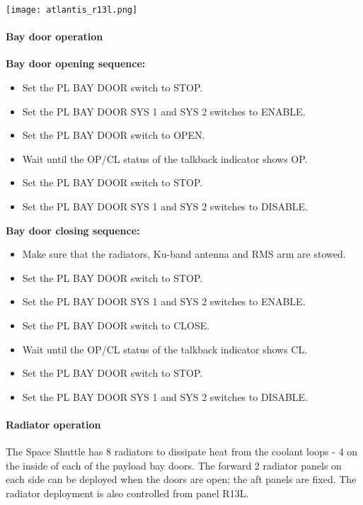 \documentclass[Orbiter User Manual.tex]{subfiles}
\begin{document}
\begin{center}
\texttt{[image: atlantis\_r13l.png]}
\end{center}

\paragraph{Bay door operation}
\label{para:atlantis_baydoor}

\textbf{Bay door opening sequence:}
\begin{itemize}
\item Set the PL BAY DOOR switch to STOP.
\item Set the PL BAY DOOR SYS 1 and SYS 2 switches to ENABLE.
\item Set the PL BAY DOOR switch to OPEN.
\item Wait until the OP/CL status of the talkback indicator shows OP.
\item Set the PL BAY DOOR switch to STOP.
\item Set the PL BAY DOOR SYS 1 and SYS 2 switches to DISABLE.
\end{itemize}

\noindent
\textbf{Bay door closing sequence:}
\begin{itemize}
\item Make sure that the radiators, Ku-band antenna and RMS arm are stowed.
\item Set the PL BAY DOOR switch to STOP.
\item Set the PL BAY DOOR SYS 1 and SYS 2 switches to ENABLE.
\item Set the PL BAY DOOR switch to CLOSE.
\item Wait until the OP/CL status of the talkback indicator shows CL.
\item Set the PL BAY DOOR switch to STOP.
\item Set the PL BAY DOOR SYS 1 and SYS 2 switches to DISABLE.
\end{itemize}

\paragraph{Radiator operation}
The Space Shuttle has 8 radiators to dissipate heat from the coolant loops - 4 on the inside of each of the payload bay doors. The forward 2 radiator panels on each side can be deployed when the doors are open; the aft panels are fixed. The radiator deployment is also controlled from panel R13L.\\
\end{document}
